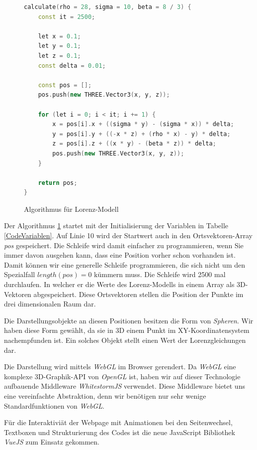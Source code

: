 \begin{figure}
	\begin{lstlisting}[style=C, language=C++]
calculate(rho = 28, sigma = 10, beta = 8 / 3) {
	const it = 2500;
	
	let x = 0.1;
	let y = 0.1;
	let z = 0.1;
	const delta = 0.01;
	
	const pos = [];
	pos.push(new THREE.Vector3(x, y, z));
	
	for (let i = 0; i < it; i += 1) {
		x = pos[i].x + ((sigma * y) - (sigma * x)) * delta;
		y = pos[i].y + ((-x * z) + (rho * x) - y) * delta;
		z = pos[i].z + ((x * y) - (beta * z)) * delta;
		pos.push(new THREE.Vector3(x, y, z));
	}
	
	return pos;
}
		\end{lstlisting}
		\caption{Algorithmus für Lorenz-Modell\label{AlgorithmusLorenz}}
\end{figure}


Der Algorithmus \ref{AlgorithmusLorenz} startet mit der Initialisierung der Variablen in Tabelle \ref{CodeVariablen}. Auf Linie 10 wird der Startwert auch in den Ortsvektoren-Array \textit{pos} gespeichert. Die Schleife wird damit einfacher zu programmieren, wenn Sie immer davon ausgehen kann, dass eine Position vorher schon vorhanden ist. Damit können wir eine generelle Schleife programmieren, die sich nicht um den Spezialfall $ length(pos) = 0 $ kümmern muss.
Die Schleife wird 2500 mal durchlaufen. In welcher er die Werte des Lorenz-Modells in einem Array als 3D-Vektoren abgespeichert. Diese Ortsvektoren stellen die Position der Punkte im drei dimensionalen Raum dar.

Die Darstellungsobjekte an diesen Positionen besitzen die Form von \textit{Spheren}. Wir haben diese Form gewählt, da sie in 3D einem Punkt im XY-Koordinatensystem nachempfunden ist. Ein solches Objekt stellt einen Wert der Lorenzgleichungen dar.

Die Darstellung wird mittels \textit{WebGL}\cite{WebGL} im Browser gerendert. Da \textit{WebGL} eine komplexe 3D-Graphik-API von \textit{OpenGL} ist, haben wir auf dieser Technologie aufbauende Middleware \textit{WhitestormJS}\cite{whitestormJS} verwendet. Diese Middleware bietet uns eine vereinfachte Abstraktion, denn wir benötigen nur sehr wenige Standardfunktionen von \textit{WebGL}.

Für die Interaktiviät der Webpage mit Animationen bei den Seitenwechsel, Textboxen und Strukturierung des Codes ist die neue JavaScript Bibliothek \textit{VueJS}\cite{VueJS} zum Einsatz gekommen.


